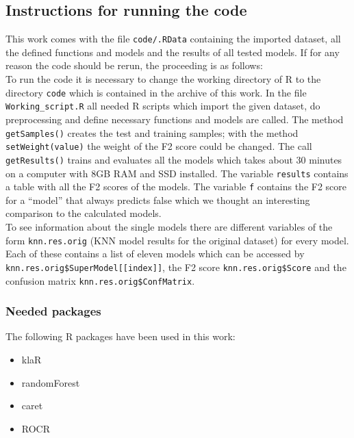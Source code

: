 \subsection{Instructions for running the code}

This work comes with the file \texttt{code/.RData} containing the imported dataset, all the defined functions and models and the results of all tested models.
If for any reason the code should be rerun, the proceeding is as follows:\\
To run the code it is necessary to change the working directory of R to the directory \texttt{code} which is contained in the archive of this work. In the file \texttt{Working\_script.R} all needed R scripts which import the given dataset, do preprocessing and define necessary functions and models are called. The method \texttt{getSamples()} creates the test and training samples; with the method \texttt{setWeight(value)} the weight of the F2 score could be changed. The call \texttt{getResults()} trains and evaluates all the models which takes about 30 minutes on a computer with 8GB RAM and SSD installed. The variable \texttt{results} contains a table with all the F2 scores of the models. The variable \texttt{f} contains the F2 score for a ``model'' that always predicts false which we thought an interesting comparison to the calculated models.\\
To see information about the single models there are different variables of the form \texttt{knn.res.orig} (KNN model results for the original dataset) for every model. Each of these contains a list of eleven models which can be accessed by \texttt{knn.res.orig\$SuperModel[[index]]}, the F2 score \texttt{knn.res.orig\$Score} and the confusion matrix \texttt{knn.res.orig\$ConfMatrix}.

\subsubsection{Needed packages}

The following R packages have been used in this work:

\begin{itemize}
\item{klaR}
\item{randomForest}
\item{caret}
\item{ROCR}
\end{itemize}
